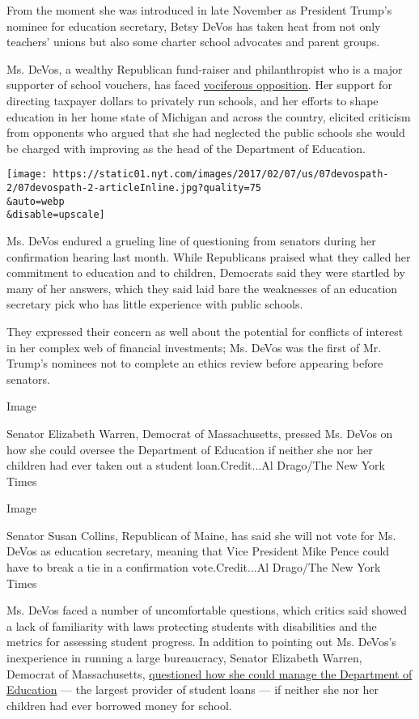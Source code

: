 From the moment she was introduced in late November as President Trump's
nominee for education secretary, Betsy DeVos has taken heat from not
only teachers' unions but also some charter school advocates and parent
groups.

Ms. DeVos, a wealthy Republican fund-raiser and philanthropist who is a
major supporter of school vouchers, has faced
\href{https://www.nytimes.com/2016/11/23/us/politics/betsy-devos-trumps-education-pick-has-steered-money-from-public-schools.html}{vociferous
opposition}. Her support for directing taxpayer dollars to privately run
schools, and her efforts to shape education in her home state of
Michigan and across the country, elicited criticism from opponents who
argued that she had neglected the public schools she would be charged
with improving as the head of the Department of Education.

\texttt{[image: https://static01.nyt.com/images/2017/02/07/us/07devospath-2/07devospath-2-articleInline.jpg?quality=75\\\&auto=webp\\\&disable=upscale]}

Ms. DeVos endured a grueling line of questioning from senators during
her confirmation hearing last month. While Republicans praised what they
called her commitment to education and to children, Democrats said they
were startled by many of her answers, which they said laid bare the
weaknesses of an education secretary pick who has little experience with
public schools.

They expressed their concern as well about the potential for conflicts
of interest in her complex web of financial investments; Ms. DeVos was
the first of Mr. Trump's nominees not to complete an ethics review
before appearing before senators.

Image

Senator Elizabeth Warren, Democrat of Massachusetts, pressed Ms. DeVos
on how she could oversee the Department of Education if neither she nor
her children had ever taken out a student loan.Credit...Al Drago/The New
York Times

Image

Senator Susan Collins, Republican of Maine, has said she will not vote
for Ms. DeVos as education secretary, meaning that Vice President Mike
Pence could have to break a tie in a confirmation vote.Credit...Al
Drago/The New York Times

Ms. DeVos faced a number of uncomfortable questions, which critics said
showed a lack of familiarity with laws protecting students with
disabilities and the metrics for assessing student progress. In addition
to pointing out Ms. DeVos's inexperience in running a large bureaucracy,
Senator Elizabeth Warren, Democrat of Massachusetts,
\href{https://www.nytimes.com/2017/01/17/us/politics/betsy-devos-education-senate-hearing.html}{questioned
how she could manage the Department of Education} --- the largest
provider of student loans --- if neither she nor her children had ever
borrowed money for school.

